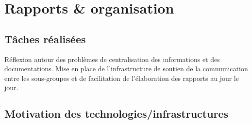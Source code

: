 \documentclass{article}
\begin{document}
\section{Rapports \& organisation}

    \subsection{Tâches réalisées} 
    Réflexion autour des problèmes de centralisation des informations et des documentations.
    Mise en place de l'infrastructure de soutien de la communication entre les sous-groupes et de facilitation de l'élaboration des rapports au jour le jour.
    \subsection{Motivation des technologies/infrastructures}
\end{document}
